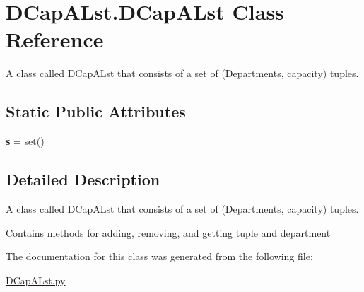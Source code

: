 \hypertarget{class_d_cap_a_lst_1_1_d_cap_a_lst}{}\section{D\+Cap\+A\+Lst.\+D\+Cap\+A\+Lst Class Reference}
\label{class_d_cap_a_lst_1_1_d_cap_a_lst}


A class called \mbox{\hyperlink{class_d_cap_a_lst_1_1_d_cap_a_lst}{D\+Cap\+A\+Lst}} that consists of a set of (Departments, capacity) tuples.  


\subsection*{Static Public Attributes}
\begin{DoxyCompactItemize}
\item 
\mbox{\label{class_d_cap_a_lst_1_1_d_cap_a_lst_a3beaf12440f69c7c35f12c8fde66e139}} 
{\bfseries s} = set()
\end{DoxyCompactItemize}


\subsection{Detailed Description}
A class called \mbox{\hyperlink{class_d_cap_a_lst_1_1_d_cap_a_lst}{D\+Cap\+A\+Lst}} that consists of a set of (Departments, capacity) tuples. 

Contains methods for adding, removing, and getting tuple and department 

The documentation for this class was generated from the following file\+:\begin{DoxyCompactItemize}
\item 
\mbox{\hyperlink{_d_cap_a_lst_8py}{D\+Cap\+A\+Lst.\+py}}\end{DoxyCompactItemize}
